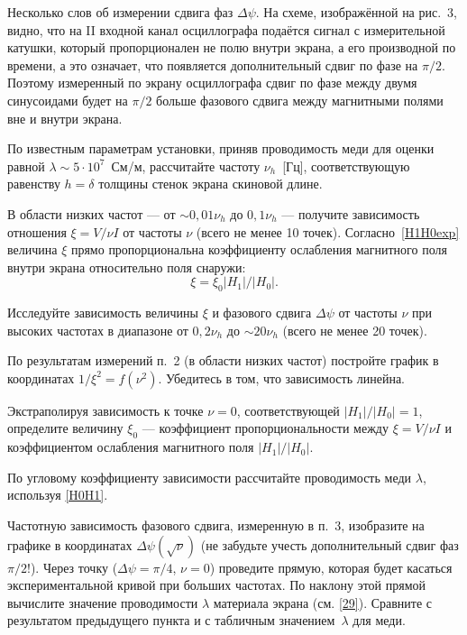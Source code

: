 Несколько слов об измерении сдвига фаз $\Delta\psi$. На схеме, 
изображённой на рис.~3, видно, что на II входной канал
осциллографа подаётся сигнал с измерительной катушки, который пропорционален 
не полю внутри экрана, а его производной по времени, а это означает, 
что появляется дополнительный сдвиг по фазе на $\pi/2$. Поэтому измеренный 
по экрану осциллографа сдвиг по фазе между двумя синусоидами будет 
на $\pi/2$ больше фазового сдвига между магнитными полями вне и
внутри экрана.

\begin{lab:task}
\item По известным параметрам установки, приняв проводимость меди
для оценки равной $\lambda \sim 5\cdot 10^{7}$~См/м, рассчитайте частоту
$\nu_h$~[Гц], соответствующую равенству $h=\delta$ толщины стенок экрана 
скиновой длине.

\item В области низких частот --- от  $\sim 0,01\nu_h$ до $0,1\nu_{h}$ --- получите зависимость отношения $\xi = V/\nu I$ от
частоты $\nu$ (всего не менее 10 точек). Согласно~\eqref{H1H0exp} величина $\xi$ прямо
пропорциональна коэффициенту ослабления магнитного поля внутри 
экрана относительно поля снаружи: 
\[\xi=\xi_0 |H_1|/|H_0|.\]

\item Исследуйте зависимость величины $\xi$ 
и фазового сдвига $\Delta\psi$ от частоты $\nu$ при высоких частотах
в диапазоне от $0,2\nu_h$ до $\sim 20\nu_h$
(всего не менее 20 точек).


\item По результатам измерений п.~2 (в области низких частот)
постройте график в координатах $1/\xi^2=f(\nu^2)$.
Убедитесь в том, что зависимость линейна. 

Экстраполируя зависимость к точке $\nu=0$, соответствующей
$|H_1|/|H_0|=1$, определите величину $\xi_0$ --- коэффициент
пропорциональности между $\xi=V/\nu I$ и коэффициентом ослабления магнитного поля 
$|H_1|/|H_0|$.

По угловому коэффициенту зависимости рассчитайте проводимость меди $\lambda$,
используя \eqref{H0H1}.

\item Частотную зависимость фазового сдвига,
измеренную в п.~3, изобразите на графике в координатах 
$\Delta\psi(\sqrt{\nu})$ (не забудьте учесть дополнительный сдвиг фаз $\pi/2$!). 
Через точку ($\Delta\psi=\pi/4$, $\nu=0$) проведите прямую, 
которая будет касаться экспериментальной кривой при больших частотах. 
По наклону этой прямой вычислите значение проводимости $\lambda$ материала экрана
(см. \eqref{29}). 
Сравните с результатом предыдущего пункта и с табличным значением~$\lambda$ для меди.


\end{lab:task}
